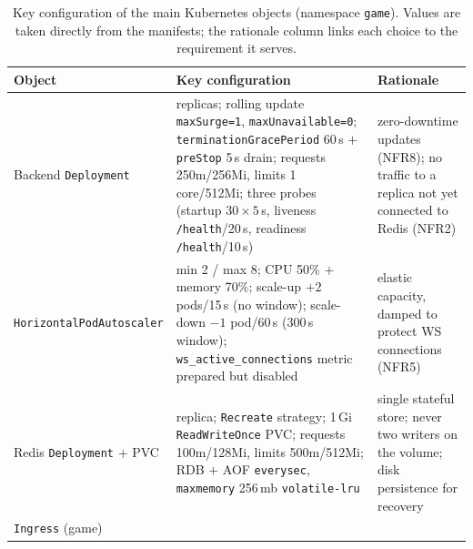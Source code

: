 \documentclass{scrartcl}
\begin{document}
\begin{table}
      \centering
      \footnotesize
      \setlength{\tabcolsep}{6pt}
      \renewcommand{\arraystretch}{1.3}
      \caption{Key configuration of the main Kubernetes objects (namespace
            \texttt{game}). Values are taken directly from the manifests; the rationale
            column links each choice to the requirement it serves.}
      \label{tab:k8s}
      \begin{tabular}{@{}
            >{\raggedright\arraybackslash}p{2.8cm}
            >{\raggedright\arraybackslash}p{7.4cm}
            >{\raggedright\arraybackslash}p{3.0cm}@{}}
            \toprule
            \textbf{Object} & \textbf{Key configuration}                                                  & \textbf{Rationale} \\
            \midrule
            Backend \texttt{Deploy\-ment}
                            & 2 replicas; rolling update \texttt{maxSurge=1}, \texttt{maxUnavailable=0};
            \texttt{terminationGracePeriod} 60\,s $+$ \texttt{preStop} 5\,s drain;
            requests 250m/256Mi, limits 1\,core/512Mi; three probes (startup
            $30\times5$\,s, liveness \texttt{/health}/20\,s, readiness
            \texttt{/health}/10\,s)
                            & zero-downtime updates (NFR8); no traffic to a replica not yet connected to
            Redis (NFR2)                                                                                                       \\
            \texttt{Horizontal\-Pod\-Autoscaler}
                            & min 2 / max 8; CPU 50\% $+$ memory 70\%; scale-up $+2$ pods/15\,s (no
            window); scale-down $-1$ pod/60\,s (300\,s window);
            \texttt{ws\_active\_connections} metric prepared but disabled
                            & elastic capacity, damped to protect WS connections (NFR5)                                        \\
            Redis \texttt{Deploy\-ment} $+$ PVC
                            & 1 replica; \texttt{Recreate} strategy; 1\,Gi \texttt{ReadWrite\-Once} PVC;
            requests 100m/128Mi, limits 500m/512Mi; RDB $+$ AOF \texttt{everysec},
            \texttt{maxmemory} 256\,mb \texttt{volatile-lru}
                            & single stateful store; never two writers on the volume; disk persistence
            for recovery                                                                                                       \\
            \texttt{Ingress} (game)

\end{tabular}
\end{table}
\end{document}
